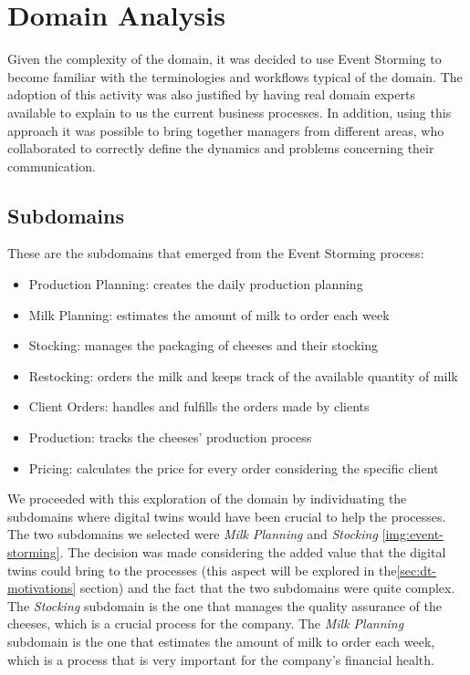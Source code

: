 \chapter{Domain Analysis}
Given the complexity of the domain, it was decided to use Event Storming to become familiar with the terminologies and workflows typical of the domain. The adoption of this activity was also justified by having real domain experts available to explain to us the current business processes. In addition, using this approach it was possible to bring together managers from different areas, who collaborated to correctly define the dynamics and problems concerning their communication.

\section{Subdomains}
These are the subdomains that emerged from the Event Storming process:
\begin{itemize}
    \item Production Planning: creates the daily production planning
    \item Milk Planning: estimates the amount of milk to order each week
    \item Stocking: manages the packaging of cheeses and their stocking
    \item Restocking: orders the milk and keeps track of the available quantity of milk
    \item Client Orders: handles and fulfills the orders made by clients
    \item Production: tracks the cheeses' production process
    \item Pricing: calculates the price for every order considering the specific client
\end{itemize}

We proceeded with this exploration of the domain by individuating the subdomains where digital twins would have been crucial to help the processes.
The two subdomains we selected were \textit{Milk Planning} and \textit{Stocking} \ref{img:event-storming}.
The decision was made considering the added value that the digital twins could bring to the processes (this aspect will be explored in the\ref{sec:dt-motivations} section) and the fact that the two subdomains were quite complex.
The \textit{Stocking} subdomain is the one that manages the quality assurance of the cheeses, which is a crucial process for the company.
The \textit{Milk Planning} subdomain is the one that estimates the amount of milk to order each week, which is a process that is very important for the company's financial health.


